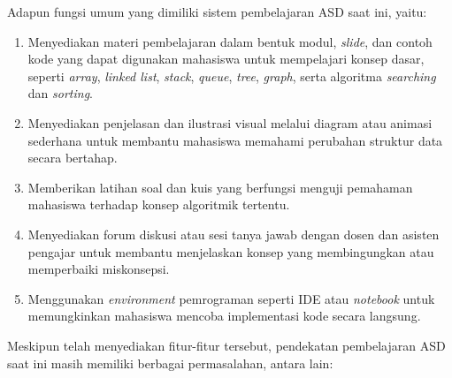 Adapun fungsi umum yang dimiliki sistem pembelajaran ASD saat ini, yaitu:

\begin{enumerate}
    \item Menyediakan materi pembelajaran dalam bentuk modul, \textit{slide}, dan contoh kode yang dapat digunakan mahasiswa untuk mempelajari konsep dasar, seperti \textit{array}, \textit{linked list}, \textit{stack}, \textit{queue}, \textit{tree}, \textit{graph}, serta algoritma \textit{searching} dan \textit{sorting}.
    \item Menyediakan penjelasan dan ilustrasi visual melalui diagram atau animasi sederhana untuk membantu mahasiswa memahami perubahan struktur data secara bertahap.
    \item Memberikan latihan soal dan kuis yang berfungsi menguji pemahaman mahasiswa terhadap konsep algoritmik tertentu.
    \item Menyediakan forum diskusi atau sesi tanya jawab dengan dosen dan asisten pengajar untuk membantu menjelaskan konsep yang membingungkan atau memperbaiki miskonsepsi.
    \item Menggunakan \textit{environment} pemrograman seperti IDE atau \textit{notebook} untuk memungkinkan mahasiswa mencoba implementasi kode secara langsung.
\end{enumerate}

Meskipun telah menyediakan fitur-fitur tersebut, pendekatan pembelajaran ASD saat ini masih memiliki berbagai permasalahan, antara lain:

